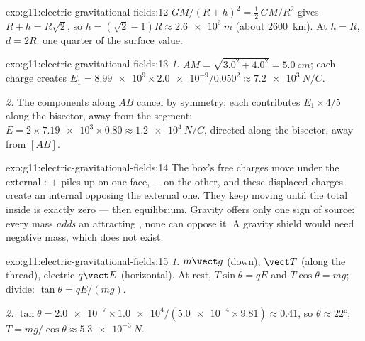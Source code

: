 \begin{solution}{exo:g11:electric-gravitational-fields:12}
$GM/(R+h)^2 = \tfrac12\,GM/R^2$ gives $R + h = R\sqrt{2}$, so
$h = (\sqrt{2} - 1)R \approx \qty{2.6e6}{m}$ (about \qty{2600}{km}). At
$h = R$, $d = 2R$: one quarter of the surface value.
\end{solution}

\begin{solution}{exo:g11:electric-gravitational-fields:13}
\emph{1.} $AM = \sqrt{3.0^2 + 4.0^2} = \qty{5.0}{cm}$; each charge
creates $E_1 = \num{8.99e9} \times \num{2.0e-9} / 0.050^2
\approx \qty{7.2e3}{N/C}$.

\emph{2.} The components along $AB$ cancel by symmetry; each 
contributes $E_1 \times 4/5$ along the bisector, away from the segment:
$E = 2 \times \num{7.19e3} \times 0.80 \approx \qty{1.2e4}{N/C}$,
directed along the bisector, away from $[AB]$.
\end{solution}

\begin{solution}{exo:g11:electric-gravitational-fields:14}
The box's free charges move under the external : $+$ piles up on
one face, $-$ on the other, and these displaced charges create an
internal  opposing the external one. They keep moving until the
total  inside is exactly zero --- then equilibrium. Gravity offers
only one sign of source: every mass \emph{adds} an attracting ,
none can oppose it. A gravity shield would need negative mass, which
does not exist.
\end{solution}

\begin{solution}{exo:g11:electric-gravitational-fields:15}
\emph{1.}  $m\vect g$ (down),  $\vect T$ (along the
thread), electric  $q\vect E$ (horizontal). At rest,
$T\sin\theta = qE$ and $T\cos\theta = mg$; divide:
$\tan\theta = qE/(mg)$.

\emph{2.} $\tan\theta = \num{2.0e-7} \times \num{1.0e4} /
(\num{5.0e-4} \times 9.81) \approx 0.41$, so $\theta \approx \ang{22}$;
$T = mg/\cos\theta \approx \qty{5.3e-3}{N}$.
\end{solution}

